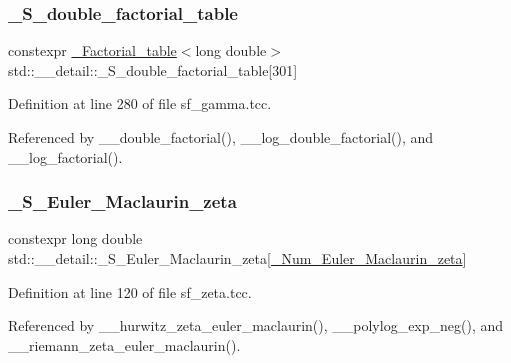 \subsubsection{\texorpdfstring{\+\_\+\+S\+\_\+double\+\_\+factorial\+\_\+table}{\_S\_double\_factorial\_table}}
{\footnotesize\ttfamily constexpr \hyperlink{structstd_1_1____detail_1_1__Factorial__table}{\+\_\+\+Factorial\+\_\+table}$<$long double$>$ std\+::\+\_\+\+\_\+detail\+::\+\_\+\+S\+\_\+double\+\_\+factorial\+\_\+table\mbox{[}301\mbox{]}}



Definition at line 280 of file sf\+\_\+gamma.\+tcc.



Referenced by \+\_\+\+\_\+double\+\_\+factorial(), \+\_\+\+\_\+log\+\_\+double\+\_\+factorial(), and \+\_\+\+\_\+log\+\_\+factorial().

\mbox{\label{namespacestd_1_1____detail_acd941b49595dd03e93c88107ad2f68c2}} 
\subsubsection{\texorpdfstring{\+\_\+\+S\+\_\+\+Euler\+\_\+\+Maclaurin\+\_\+zeta}{\_S\_Euler\_Maclaurin\_zeta}}
{\footnotesize\ttfamily constexpr long double std\+::\+\_\+\+\_\+detail\+::\+\_\+\+S\+\_\+\+Euler\+\_\+\+Maclaurin\+\_\+zeta\mbox{[}\hyperlink{namespacestd_1_1____detail_ab27e687e1052be7a72de187e0dead124}{\+\_\+\+Num\+\_\+\+Euler\+\_\+\+Maclaurin\+\_\+zeta}\mbox{]}}



Definition at line 120 of file sf\+\_\+zeta.\+tcc.



Referenced by \+\_\+\+\_\+hurwitz\+\_\+zeta\+\_\+euler\+\_\+maclaurin(), \+\_\+\+\_\+polylog\+\_\+exp\+\_\+neg(), and \+\_\+\+\_\+riemann\+\_\+zeta\+\_\+euler\+\_\+maclaurin().

\mbox{\label{namespacestd_1_1____detail_a008b54abe31c1027aefdfd7a76a40e99}} 
